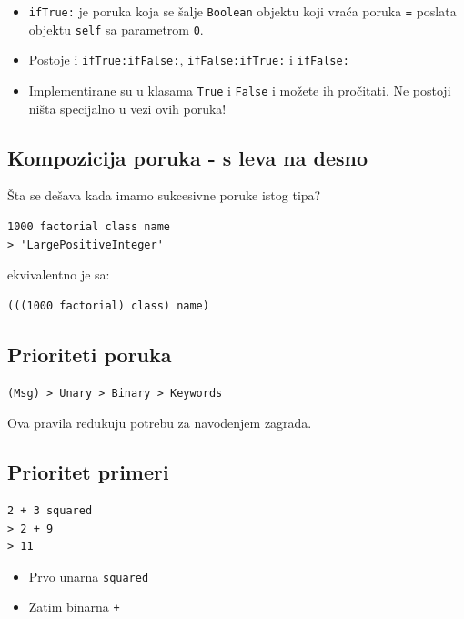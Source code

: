 \documentclass[presentation]{beamer}
\begin{document}
\begin{itemize}
\item \texttt{ifTrue:} je poruka koja se šalje \texttt{Boolean} objektu koji vraća poruka \texttt{=}
poslata objektu \texttt{self} sa parametrom \texttt{0}.
\item Postoje i \texttt{ifTrue:ifFalse:}, \texttt{ifFalse:ifTrue:} i \texttt{ifFalse:}
\item Implementirane su u klasama \texttt{True} i \texttt{False} i možete ih pročitati. Ne postoji
ništa specijalno u vezi ovih poruka!
\end{itemize}

\subsection{Kompozicija poruka - s leva na desno}
\label{sec:org4be6691}

Šta se dešava kada imamo sukcesivne poruke istog tipa?

\begin{verbatim}
1000 factorial class name
> 'LargePositiveInteger'
\end{verbatim}

ekvivalentno je sa:

\begin{verbatim}
(((1000 factorial) class) name)
\end{verbatim}

\subsection{Prioriteti poruka}
\label{sec:org8a895ed}

\begin{verbatim}
(Msg) > Unary > Binary > Keywords
\end{verbatim}

Ova pravila redukuju potrebu za navođenjem zagrada.

\subsection{Prioritet primeri}
\label{sec:orgf780930}

\begin{verbatim}
2 + 3 squared
> 2 + 9
> 11
\end{verbatim}

\begin{itemize}
\item Prvo unarna \texttt{squared}
\item Zatim binarna \texttt{+}
\end{itemize}
\end{document}
